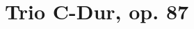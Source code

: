 \section*{Trio C-Dur, op. 87}
    
{%
\parindent 0pt
\noindent
\ifx\preLilyPondExample \undefined
\else
  \expandafter\preLilyPondExample
\fi
\def\lilypondbook{}%

\ifx\postLilyPondExample \undefined
\else
  \expandafter\postLilyPondExample
\fi
}
{%
\parindent 0pt
\noindent
\ifx\preLilyPondExample \undefined
\else
  \expandafter\preLilyPondExample
\fi
\def\lilypondbook{}%

\ifx\postLilyPondExample \undefined
\else
  \expandafter\postLilyPondExample
\fi
}
\\\vspace*{1cm}	
